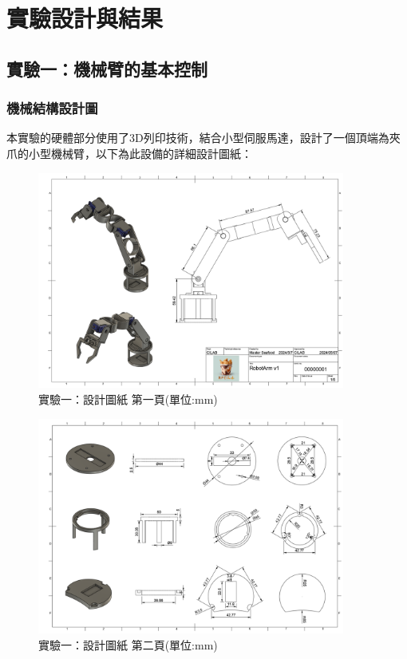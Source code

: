 \documentclass[class=NCU_thesis, crop=false]{standalone}
\begin{document}
\chapter{實驗設計與結果}

\section{實驗一：機械臂的基本控制}
\subsection{機械結構設計圖}
本實驗的硬體部分使用了3D列印技術，結合小型伺服馬達，設計了一個頂端為夾爪的小型機械臂，以下為此設備的詳細設計圖紙：
\begin{figure}[htbp]
    \centering
    \includegraphics[width=0.9\textwidth]{figures/Armv1 (1).PNG}
    \caption{實驗一：設計圖紙 第一頁(單位:mm)}
\end{figure}

\begin{figure}[htbp]
    \centering
    \includegraphics[width=0.9\textwidth]{figures/Armv1 (2).PNG}
    \caption{實驗一：設計圖紙 第二頁(單位:mm)}
\end{figure}
\end{document}
